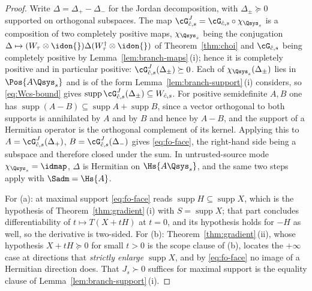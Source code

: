 \begin{proof}
Write $\Delta=\Delta_{+}-\Delta_{-}$ for the Jordan decomposition, with
$\Delta_{\pm}\succeq0$ supported on orthogonal subspaces. The map
$\cG^{J}_{\hat c,s}=\cG_{\hat c,s}\circ\chi_{\Qsys_s}$ is a composition of
two completely positive maps, $\chi_{\Qsys_s}$ being the conjugation
$\Delta\mapsto(W_{\tau}\otimes\idon{})\Delta(W_{\tau}^{\dagger}\otimes
\idon{})$ of Theorem~\ref{thm:choi} and $\cG_{\hat c,s}$ being completely
positive by Lemma~\ref{lem:branch-maps}\,(i); hence it is completely
positive and in particular positive: $\cG^{J}_{\hat c,s}(\Delta_{\pm})\succeq0$.
Each of $\chi_{\Qsys_s}(\Delta_{\pm})$ lies in $\Pos{A\Qsys_s}$ and is of
the form Lemma~\ref{lem:branch-support}\,(i) considers, so
\eqref{eq:Wcs-bound} gives
$\operatorname{supp}\cG^{J}_{\hat c,s}(\Delta_{\pm})\subseteq W_{\hat c,s}$.
For positive semidefinite $A,B$ one has
$\operatorname{supp}(A-B)\subseteq\operatorname{supp}A
+\operatorname{supp}B$, since a vector orthogonal to both supports is
annihilated by $A$ and by $B$ and hence by $A-B$, and the support of a
Hermitian operator is the orthogonal complement of its kernel. Applying
this to $A=\cG^{J}_{\hat c,s}(\Delta_{+})$,
$B=\cG^{J}_{\hat c,s}(\Delta_{-})$ gives \eqref{eq:fo-face}, the
right-hand side being a subspace and therefore closed under the sum. In
untrusted-source mode $\chi_{\Qsys_s}=\idmap$, $\Delta$ is Hermitian on
$\Hs{A\Qsys_s}$, and the same two steps apply with
$\Sadm=\Hs{A}$.

For (a): at maximal support \eqref{eq:fo-face} reads
$\operatorname{supp}H\subseteq\operatorname{supp}X$, which is the
hypothesis of Theorem~\ref{thm:gradient}\,(i) with $S=\operatorname{supp}X$;
that part concludes differentiability of $t\mapsto T(X+tH)$ at $t=0$, and
its hypothesis holds for $-H$ as well, so the derivative is two-sided.
For (b): Theorem~\ref{thm:gradient}\,(ii), whose hypothesis
$X+tH\succeq0$ for small $t>0$ is the scope clause of (b), locates the
$+\infty$ case at directions that \emph{strictly enlarge}
$\operatorname{supp}X$, and by \eqref{eq:fo-face} no image of a Hermitian
direction does. That $J_s\succ0$ suffices for maximal support is the
equality clause of Lemma~\ref{lem:branch-support}\,(i).
\end{proof}
